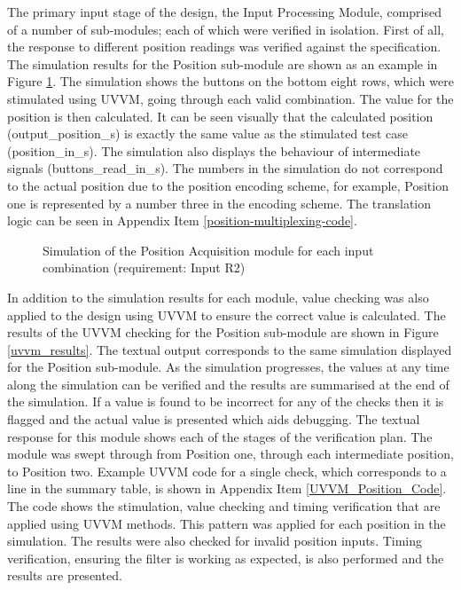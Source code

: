The primary input stage of the design, the Input Processing Module, comprised of a number of sub-modules; each of which were verified in isolation. First of all, the response to different position readings was verified against the specification. The simulation results for the Position sub-module are shown as an example in Figure \ref{position_sim}. The simulation shows the buttons on the bottom eight rows, which were stimulated using UVVM, going through each valid combination. The value for the position is then calculated. It can be seen visually that the calculated position (output\_position\_s) is exactly the same value as the stimulated test case (position\_in\_s). The simulation also displays the behaviour of intermediate signals (buttons\_read\_in\_s). The numbers in the simulation do not correspond to the actual position due to the position encoding scheme, for example, Position one is represented by a number three in the encoding scheme. The translation logic can be seen in Appendix Item \ref{position-multiplexing-code}.

\begin{figure}[h]
\centering
{}
\caption{Simulation of the Position Acquisition module for each input combination (requirement: Input R2)}
\label{position_sim}
\end{figure}


In addition to the simulation results for each module, value checking was also applied to the design using UVVM to ensure the correct value is calculated. The results of the UVVM checking for the Position sub-module are shown in Figure \ref{uvvm_results}. The textual output corresponds to the same simulation displayed for the Position sub-module. As the simulation progresses, the values at any time along the simulation can be verified and the results are summarised at the end of the simulation. If a value is found to be incorrect for any of the checks then it is flagged and the actual value is presented which aids debugging. The textual response for this module shows each of the stages of the verification plan. The module was swept through from Position one, through each intermediate position, to Position two. Example UVVM code for a single check, which corresponds to a line in the summary table, is shown in Appendix Item \ref{UVVM_Position_Code}. The code shows the stimulation, value checking and timing verification that are applied using UVVM methods. This pattern was applied for each position in the simulation.
The results were also checked for invalid position inputs. Timing verification, ensuring the filter is working as expected, is also performed and the results are presented.


